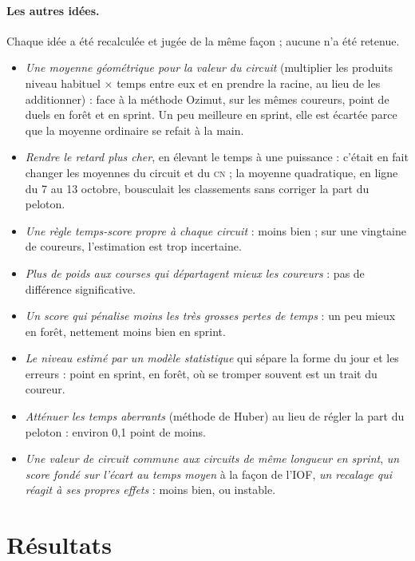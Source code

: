 \documentclass[11pt,a4paper]{article}
\newcommand{\CN}{\textsc{cn}}
\begin{document}
\paragraph{Les autres idées.} Chaque idée a été recalculée et jugée de la même façon ; aucune n'a été retenue.
\begin{itemize}
  \item \emph{Une moyenne géométrique pour la valeur du circuit} (multiplier les produits niveau habituel $\times$ temps entre eux et en prendre la racine, au lieu de les additionner) : face à la méthode Ozimut, sur les mêmes coureurs, \NgeoVarF{} point de duels en forêt et \NgeoVarS{} en sprint. Un peu meilleure en sprint, elle est écartée parce que la moyenne ordinaire se refait à la main.
  \item \emph{Rendre le retard plus cher}, en élevant le temps à une puissance : c'était en fait changer les moyennes du circuit et du \CN{} ; la moyenne quadratique, en ligne du 7 au 13 octobre, bousculait les classements sans corriger la part du peloton.
  \item \emph{Une règle temps-score propre à chaque circuit} : moins bien ; sur une vingtaine de coureurs, l'estimation est trop incertaine.
  \item \emph{Plus de poids aux courses qui départagent mieux les coureurs} : pas de différence significative.
  \item \emph{Un score qui pénalise moins les très grosses pertes de temps} : un peu mieux en forêt, nettement moins bien en sprint.
  \item \emph{Le niveau estimé par un modèle statistique} qui sépare la forme du jour et les erreurs : \NmleS{} point en sprint, \NmleF{} en forêt, où se tromper souvent est un trait du coureur.
  \item \emph{Atténuer les temps aberrants} (méthode de Huber) au lieu de régler la part du peloton : environ 0,1 point de moins.
  \item \emph{Une valeur de circuit commune aux circuits de même longueur en sprint}, \emph{un score fondé sur l'écart au temps moyen} à la façon de l'IOF, \emph{un recalage qui réagit à ses propres effets} : moins bien, ou instable.
\end{itemize}

\section{Résultats}
\end{document}
